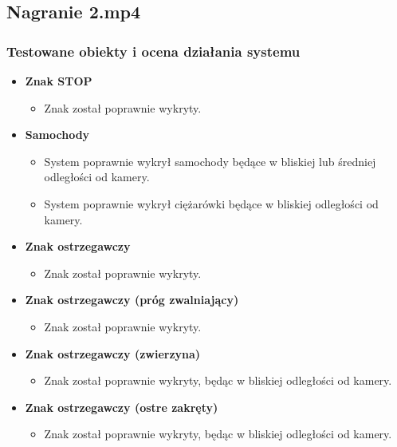 \subsection{Nagranie 2.mp4}

\subsubsection*{Testowane obiekty i ocena działania systemu}
\begin{itemize}
    \item \textbf{Znak STOP}
          \begin{itemize}
              \item Znak został poprawnie wykryty.
          \end{itemize}
    \item \textbf{Samochody}
          \begin{itemize}
              \item System poprawnie wykrył samochody będące w bliskiej lub średniej odległości od kamery.
              \item System poprawnie wykrył ciężarówki będące w bliskiej odległości od kamery.
          \end{itemize}
    \item \textbf{Znak ostrzegawczy}
          \begin{itemize}
              \item Znak został poprawnie wykryty.
          \end{itemize}
    \item \textbf{Znak ostrzegawczy (próg zwalniający)}
          \begin{itemize}
              \item Znak został poprawnie wykryty.
          \end{itemize}
    \item \textbf{Znak ostrzegawczy (zwierzyna)}
          \begin{itemize}
              \item Znak został poprawnie wykryty, będąc w bliskiej odległości od kamery.
          \end{itemize}
    \item \textbf{Znak ostrzegawczy (ostre zakręty)}
          \begin{itemize}
              \item Znak został poprawnie wykryty, będąc w bliskiej odległości od kamery.
          \end{itemize}
\end{itemize}

